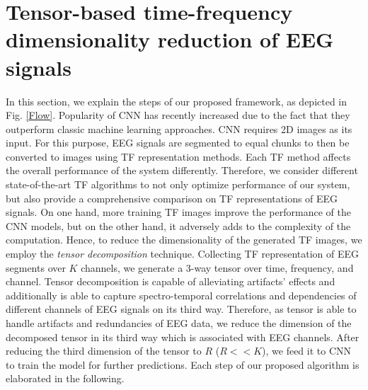 \documentclass{article}
\begin{document}
\section{Tensor-based time-frequency dimensionality reduction of EEG signals}
\vspace{-2mm}
In this section, we explain the steps of our proposed framework, as depicted in Fig. \ref{Flow}.
Popularity of CNN has recently increased due to the fact that they outperform classic machine learning approaches. CNN requires 2D images as its input. For this purpose, EEG signals are segmented to equal chunks to then be converted to images using TF representation methods. Each TF method affects the overall performance of the system differently. Therefore, we consider different state-of-the-art TF algorithms to not only optimize performance of our system, but also provide a comprehensive comparison on TF representations of EEG signals. On one hand, more training TF images improve the performance of the CNN models, but on the other hand, it adversely adds to the complexity of the computation. Hence, to reduce the dimensionality of the generated TF images, we employ the \emph{tensor decomposition} technique. Collecting TF representation of EEG segments over $K$ channels, we generate a 3-way tensor over time, frequency, and channel. Tensor decomposition is capable of alleviating artifacts' effects and additionally is able to capture spectro-temporal correlations and dependencies of different channels of EEG signals on its third way. Therefore, as tensor is able to handle artifacts and redundancies of EEG data, we reduce the dimension of the decomposed tensor in its third way which is associated with EEG channels.
After reducing the third dimension of the tensor
to $R$ ($R<<K$), we feed it to CNN to train the model for further predictions. Each step of our proposed algorithm is elaborated in the following.
\vspace{-5mm}
\end{document}
